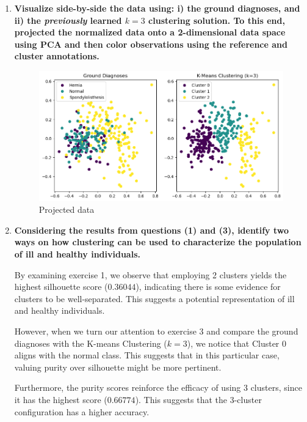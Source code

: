 \documentclass[12pt]{article}
\begin{document}
\begin{enumerate}[leftmargin=\labelsep]
\begin{enumerate}
        \end{enumerate}

  \item \textbf{Visualize side-by-side the data using: i) the ground diagnoses, and ii) the \textit{previously} learned
          $k = 3$ clustering solution. To this end, projected the normalized data onto a 2-dimensional data
          space using PCA and then color observations using the reference and cluster annotations.}

        \vskip 0.3cm
        

        \begin{figure}[H]
          \centering
          \includegraphics[width=18cm]{./assets/exII3-plot.png}
          \caption{Projected data}
          \label{fig:PartII-ex3}
        \end{figure}

  \item \textbf{Considering the results from questions (1) and (3), identify two ways on how clustering can
          be used to characterize the population of ill and healthy individuals.}

        \vskip 0.3cm
        By examining exercise 1, we observe that employing 2 clusters yields the highest silhouette score ($0.36044$),
        indicating there is some evidence for clusters to be well-separated. This suggests a potential representation of ill and healthy individuals.

        However, when we turn our attention to exercise 3 and compare the ground diagnoses with the K-means Clustering ($k=3$),
        we notice that Cluster 0 aligns with the normal class. This suggests that in this particular case, valuing purity over silhouette might be more pertinent.

        Furthermore, the purity scores reinforce the efficacy of using 3 clusters, since it has the highest score ($0.66774$).
        This suggests that the 3-cluster configuration has a higher accuracy.


\end{enumerate}
\end{document}
